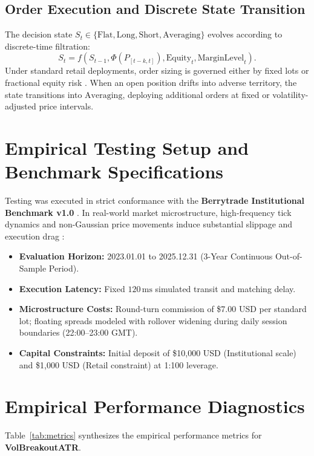 \documentclass[11pt,a4paper]{article}
\begin{document}
\subsection{Order Execution and Discrete State Transition}
The decision state $S_t \in \{\text{Flat}, \text{Long}, \text{Short}, \text{Averaging}\}$ evolves according to discrete-time filtration:
\begin{equation}
S_{t} = f(S_{t-1}, \Phi(P_{[t-k, t]}), \text{Equity}_t, \text{MarginLevel}_t).
\end{equation}
Under standard retail deployments, order sizing is governed either by fixed lots or fractional equity risk \cite{lopez2018advances, carhart1997persistence}. When an open position drifts into adverse territory, the state transitions into $\text{Averaging}$, deploying additional orders at fixed or volatility-adjusted price intervals.

\section{Empirical Testing Setup and Benchmark Specifications}
Testing was executed in strict conformance with the \textbf{Berrytrade Institutional Benchmark v1.0} \cite{artsu2026illusion}. In real-world market microstructure, high-frequency tick dynamics and non-Gaussian price movements induce substantial slippage and execution drag \cite{kyle1985continuous, amihud2002illiquidity, cont2001empirical, mandelbrot1963variation}:
\begin{itemize}
    \item \textbf{Evaluation Horizon:} 2023.01.01 to 2025.12.31 (3-Year Continuous Out-of-Sample Period).
    \item \textbf{Execution Latency:} Fixed $120\,\text{ms}$ simulated transit and matching delay.
    \item \textbf{Microstructure Costs:} Round-turn commission of \$7.00 USD per standard lot; floating spreads modeled with rollover widening during daily session boundaries (22:00--23:00 GMT).
    \item \textbf{Capital Constraints:} Initial deposit of \$10,000 USD (Institutional scale) and \$1,000 USD (Retail constraint) at 1:100 leverage.
\end{itemize}

\section{Empirical Performance Diagnostics}
Table~\ref{tab:metrics} synthesizes the empirical performance metrics for \textbf{VolBreakoutATR}.
\end{document}
